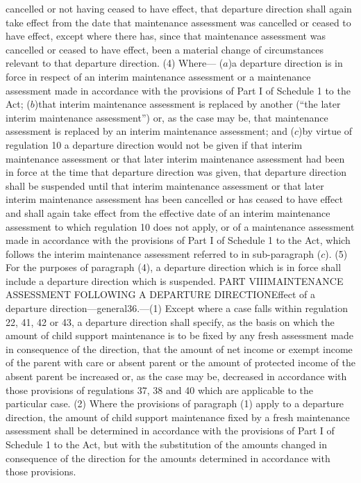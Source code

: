 \documentclass[a4paper]{article}
\begin{document}
cancelled or not having ceased to have effect, that departure direction shall
again take effect from the date that maintenance assessment was cancelled or
ceased to have effect, except where there has, since that maintenance assessment
was cancelled or ceased to have effect, been a material change of circumstances
relevant to that departure direction.
(4) Where—
($a$)a departure direction is in force in respect of an interim maintenance
assessment or a maintenance assessment made in accordance with the provisions of
Part I of Schedule 1 to the Act;
($b$)that interim maintenance assessment is replaced by another (“the later
interim maintenance assessment”) or, as the case may be, that maintenance
assessment is replaced by an interim maintenance assessment; and
($c$)by virtue of regulation 10 a departure direction would not be given if that
interim maintenance assessment or that later interim maintenance assessment had
been in force at the time that departure direction was given, that departure
direction shall be suspended until that interim maintenance assessment or that
later interim maintenance assessment has been cancelled or has ceased to have
effect and shall again take effect from the effective date of an interim
maintenance assessment to which regulation 10 does not apply, or of a
maintenance assessment made in accordance with the provisions of Part I of
Schedule 1 to the Act, which follows the interim maintenance assessment referred
to in sub-paragraph ($c$).
(5) For the purposes of paragraph (4), a departure direction which is in force
shall include a departure direction which is suspended.
PART VIIIMAINTENANCE ASSESSMENT FOLLOWING A DEPARTURE DIRECTIONEffect of a
departure direction—general36.—(1) Except where a case falls within regulation
22, 41, 42 or 43, a departure direction shall specify, as the basis on which the
amount of child support maintenance is to be fixed by any fresh assessment made
in consequence of the direction, that the amount of net income or exempt income
of the parent with care or absent parent or the amount of protected income of
the absent parent be increased or, as the case may be, decreased in accordance
with those provisions of regulations 37, 38 and 40 which are applicable to the
particular case.
(2) Where the provisions of paragraph (1) apply to a departure direction, the
amount of child support maintenance fixed by a fresh maintenance assessment
shall be determined in accordance with the provisions of Part I of Schedule 1 to
the Act, but with the substitution of the amounts changed in consequence of the
direction for the amounts determined in accordance with those provisions.
\end{document}
